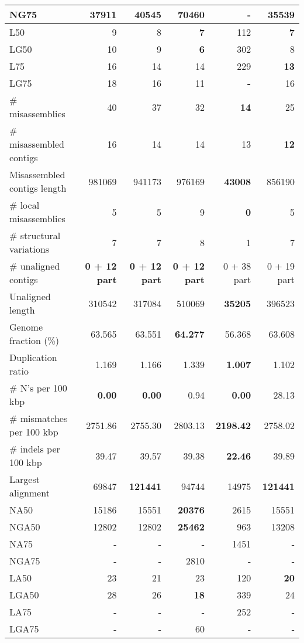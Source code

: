 \documentclass[12pt,a4paper]{article}
\begin{document}
\begin{table}[ht]
\begin{center}
\begin{tabular}{|l*{5}{|r}|}
NG75 & 37911 & 40545 & {\bf 70460} & - & 35539 \\ \hline
L50 & 9 & 8 & {\bf 7} & 112 & {\bf 7} \\ \hline
LG50 & 10 & 9 & {\bf 6} & 302 & 8 \\ \hline
L75 & 16 & 14 & 14 & 229 & {\bf 13} \\ \hline
LG75 & 18 & 16 & 11 & {\bf -} & 16 \\ \hline
\# misassemblies & 40 & 37 & 32 & {\bf 14} & 25 \\ \hline
\# misassembled contigs & 16 & 14 & 14 & 13 & {\bf 12} \\ \hline
Misassembled contigs length & 981069 & 941173 & 976169 & {\bf 43008} & 856190 \\ \hline
\# local misassemblies & 5 & 5 & 9 & {\bf 0} & 5 \\ \hline
\# structural variations & 7 & 7 & 8 & 1 & 7 \\ \hline
\# unaligned contigs & {\bf 0 + 12 part} & {\bf 0 + 12 part} & {\bf 0 + 12 part} & 0 + 38 part & 0 + 19 part \\ \hline
Unaligned length & 310542 & 317084 & 510069 & {\bf 35205} & 396523 \\ \hline
Genome fraction (\%) & 63.565 & 63.551 & {\bf 64.277} & 56.368 & 63.608 \\ \hline
Duplication ratio & 1.169 & 1.166 & 1.339 & {\bf 1.007} & 1.102 \\ \hline
\# N's per 100 kbp & {\bf 0.00} & {\bf 0.00} & 0.94 & {\bf 0.00} & 28.13 \\ \hline
\# mismatches per 100 kbp & 2751.86 & 2755.30 & 2803.13 & {\bf 2198.42} & 2758.02 \\ \hline
\# indels per 100 kbp & 39.47 & 39.57 & 39.38 & {\bf 22.46} & 39.89 \\ \hline
Largest alignment & 69847 & {\bf 121441} & 94744 & 14975 & {\bf 121441} \\ \hline
NA50 & 15186 & 15551 & {\bf 20376} & 2615 & 15551 \\ \hline
NGA50 & 12802 & 12802 & {\bf 25462} & 963 & 13208 \\ \hline
NA75 & - & - & - & 1451 & - \\ \hline
NGA75 & - & - & 2810 & - & - \\ \hline
LA50 & 23 & 21 & 23 & 120 & {\bf 20} \\ \hline
LGA50 & 28 & 26 & {\bf 18} & 339 & 24 \\ \hline
LA75 & - & - & - & 252 & - \\ \hline
LGA75 & - & - & 60 & - & - \\ \hline
\end{tabular}
\end{center}
\end{table}
\end{document}
